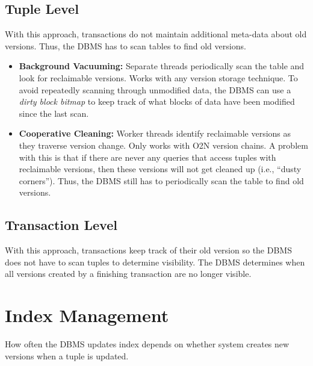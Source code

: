 \documentclass[11pt]{article}
\begin{document}
\subsection*{Tuple Level}
With this approach, transactions do not maintain additional meta-data about old versions. Thus, the 
DBMS has to scan tables to find old versions.

\begin{itemize}
    \item \textbf{Background Vacuuming:}
    Separate threads periodically scan the table and look for 
    reclaimable versions. Works with any version storage technique. To avoid repeatedly scanning 
    through unmodified data, the DBMS can use a \textit{dirty block bitmap} to keep track of what 
    blocks of data have been modified since the last scan.
    
    \item \textbf{Cooperative Cleaning:}
    Worker threads identify reclaimable versions as they 
    traverse version change. Only works with O2N version chains. A problem with this is that if 
    there are never any queries that access tuples with reclaimable versions, then these versions 
    will not get cleaned up (i.e., ``dusty corners''). Thus, the DBMS still has to periodically 
    scan the table to find old versions.
\end{itemize}

\subsection*{Transaction Level}
With this approach, transactions keep track of their old version so the DBMS does not have to 
scan tuples to determine visibility.
The DBMS determines when all versions created by a finishing transaction are no 
longer visible.
    

\section{Index Management}
How often the DBMS updates index depends on whether system creates new versions when a tuple is 
updated.
\end{document}
